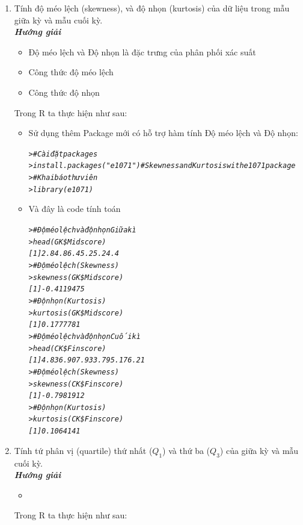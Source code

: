 \documentclass[a4paper]{article}
\theoremstyle{definition}
\begin{document}
\begin{enumerate}[1.]
\item Tính độ méo lệch (skewness), và độ nhọn (kurtosis) của dữ liệu trong mẫu giữa kỳ và mẫu cuối kỳ.
    \textbf{\textit{\\Hướng giải}}
    \begin{itemize}
        \item Độ méo lệch và Độ nhọn là đặc trưng của phân phối xác suất
        \item Công thức độ méo lệch
        \item Công thức độ nhọn
    \end{itemize}
    Trong R ta thực hiện như sau:
    \begin{itemize}
        \item Sử dụng thêm Package mới có hỗ trợ hàm tính Độ méo lệch và Độ nhọn:
    \begin{mdframed}[backgroundcolor=magenta!10]
    \begin{alltt}
    \textit{
> #Cài đặt packages
> install.packages("e1071") #Skewness and Kurtosis with e1071 package
> #Khai báo thư viên
> library(e1071)
}
    \end{alltt}
    \end{mdframed}
        \item Và đây là code tính toán
    
    \begin{mdframed}[backgroundcolor=magenta!10]
    \begin{alltt}
    \textit{
> #Độ méo lệch và độ nhọn Giữa kì
> head(GK\$Midscore)
[1] 2.8 4.8 6.4 5.2 5.2 4.4
> #Độ méo lệch (Skewness)
> skewness(GK\$Midscore)
[1] -0.4119475
> #Độ nhọn (Kurtosis)
> kurtosis(GK\$Midscore)
[1] 0.1777781
> #Độ méo lệch và độ nhọn Cuối kì
> head(CK\$Finscore)
[1] 4.83 6.90 7.93 3.79 5.17 6.21
> #Độ méo lệch (Skewness)
> skewness(CK\$Finscore)
[1] -0.7981912
> #Độ nhọn (Kurtosis)
> kurtosis(CK\$Finscore)
[1] 0.1064141
}
    \end{alltt}
    \end{mdframed}
    \end{itemize}

\item Tính tứ phân vị (quartile) thứ nhất ($Q_1$) và thứ ba ($Q_3$) của giữa kỳ và mẫu cuối kỳ.
    \textbf{\textit{\\Hướng giải}}
    \begin{itemize}
        \item 
    \end{itemize}
Trong R ta thực hiện như sau:
    \begin{mdframed}[backgroundcolor=magenta!10]
    \begin{alltt}
    \textit{
    

\end{alltt}
\end{mdframed}
\end{enumerate}
\end{document}
